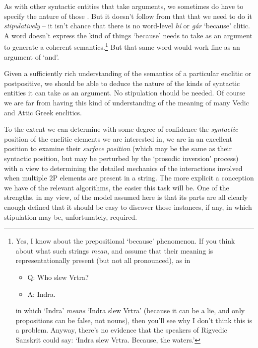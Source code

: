 \documentclass[output=paper,
modfonts
]{LSP/langsci}
\begin{document}
As with other syntactic entities that take arguments, we sometimes do have to specify the nature of those .
But it doesn't follow from that that we need to do it \textit{stipulatively} -- it isn't chance that there is no
word-level \textit{hí} or \textit{gár} `because' clitic. A word doesn't express the kind of things `because' needs to take
as an argument to generate a coherent semantics.\footnote{Yes, I know about the prepositional `because' phenomenon. If you think about what such strings \textit{mean},
and assume that their meaning is representationally present (but not all pronounced), as in 

\begin{itemize}
\item[] Q: Who slew Vrtra?
\item[] A: Indra.
\end{itemize}

\noindent in which `Indra' \textit{means} `Indra slew Vrtra' (because it can be a lie, and only propositions can be false, not
nouns), then you'll see why I don't think this is a problem. Anyway, there's no evidence that the speakers of Rigvedic Sanskrit
could say: `Indra slew Vrtra. Because, the waters.'} But that same word would work fine as an argument of `and'. 

Given a sufficiently rich understanding of the semantics of a particular enclitic or postpositive, we should be
able to deduce the nature of the kinds of syntactic entities it can take as an argument. No stipulation should
be needed. Of course we are far from having this kind of understanding of the meaning of many Vedic and Attic Greek enclitics.

To the extent we can determine with some degree of confidence the \textit{syntactic} position of the enclitic
elements we are interested in, we are in an excellent position to examine their \textit{surface position} (which may be
the same as their syntactic position, but may be perturbed by the `prosodic inversion' process) with a view to determining
the detailed mechanics of the interactions involved when multiple 2P elements are present in a string.
The more explicit a conception we have of the relevant algorithms, the easier this task will be. One of the
strengths, in my view, of the model assumed here is that its parts are all clearly enough defined that it should be
easy to discover those instances, if any, in which stipulation may be, unfortunately, required.
\end{document}
